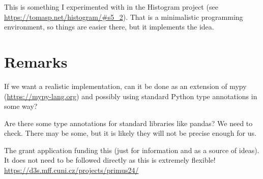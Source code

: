 \documentclass{article}
\begin{document}
This is something I experimented with in the
Histogram project (see \url{https://tomasp.net/histogram/#s5_2}). That is a minimalistic programming environment, so things are easier there, but it implements the idea.


\section{Remarks}
If we want a realistic implementation, can it be done as an extension of mypy (\url{https://mypy-lang.org}) and possibly using standard Python type annotations in some way?

Are there some type annotations for standard libraries like pandas? We need to check. There may be some, but it is likely they will not be precise enough for us.

The grant application funding this (just for information and as a source of ideas). It does not need to be followed directly as this is extremely flexible! \url{https://d3s.mff.cuni.cz/projects/primus24/}
\end{document}
